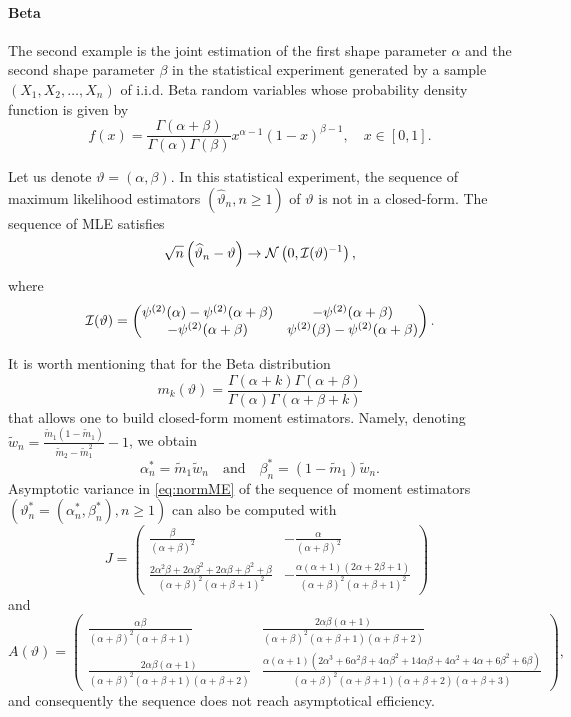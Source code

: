 

\paragraph{Beta}

The second example is the joint estimation of the first shape parameter $\alpha$ and the second shape parameter $\beta$ in the statistical experiment generated by a sample $(X_1,X_2,\ldots,X_n)$ of i.i.d. Beta random variables whose probability density function is given by
$$ f(x)= \frac{\Gamma(\alpha+\beta)}{\Gamma(\alpha)\Gamma(\beta)}x^{\alpha-1} (1-x)^{\beta-1}, \quad x \in [0,1].$$

Let us denote $\vartheta=(\alpha,\beta)$. In this statistical experiment, the sequence of maximum likelihood estimators $(\widehat{\vartheta}_n, n \geq 1)$ of $\vartheta$ is not in a closed-form.  The sequence of MLE satisfies 
$$ \sqrt{n}\left( \widehat{\vartheta}_n-\vartheta \right) \rightarrow {\cal N}\left(0,{\cal I}(\vartheta)^{-1}\right),$$
where 
$$ {\cal I}(\vartheta)=\begin{pmatrix} \psi^{(2)}(\alpha) - \psi^{(2)}(\alpha+\beta)& -\psi^{(2)}(\alpha+\beta) \\ - \psi^{(2)}(\alpha+\beta) &  \psi^{(2)}(\beta) - \psi^{(2)}(\alpha+\beta)\end{pmatrix}.$$

It is worth mentioning that for the Beta distribution 
$$ m_k(\vartheta) = \frac{\Gamma(\alpha+k)\Gamma(\alpha+\beta)}{\Gamma(\alpha)\Gamma(\alpha+\beta+k)}$$
that allows one to build closed-form moment estimators. Namely, denoting
$\tilde{w}_n= \frac{\tilde{m}_1(1-\tilde{m}_1)}{\tilde{m}_2-\tilde{m}_1^2} -1$, we obtain
$$\alpha^*_n= \tilde{m}_1 \tilde{w}_n \quad \mbox{and} \quad \beta^*_n= (1-\tilde{m}_1 )  \tilde{w}_n.$$ 
Asymptotic variance in \eqref{eq:normME} of the sequence of moment estimators $(\vartheta^*_n=(\alpha^*_n,\beta^*_n), n \geq1)$ can also be computed with
$$ \quad J=\begin{pmatrix}  \frac{\beta}{(\alpha+\beta)^2} &   -\frac{\alpha}{(\alpha+\beta)^2}  \\  \frac{2\alpha^2\beta+2\alpha \beta^2 + 2\alpha \beta +\beta^2 +\beta}{(\alpha+\beta)^2(\alpha+\beta+1)^2}  &  - \frac{ \alpha(\alpha +1)(2\alpha+2\beta+1)}{(\alpha+\beta)^2(\alpha+\beta+1)^2}  \end{pmatrix}$$
and
$$ A(\vartheta)=\begin{pmatrix} \frac{\alpha\beta}{(\alpha+\beta)^2(\alpha+\beta+1)} & \frac{2 \alpha \beta(\alpha +1)}{(\alpha+\beta)^2(\alpha+\beta+1)(\alpha+\beta+2)} \\ \frac{2 \alpha \beta(\alpha +1)}{(\alpha+\beta)^2(\alpha+\beta+1)(\alpha+\beta+2)} & \frac{\alpha(\alpha+1)(2\alpha^3+6\alpha^2\beta+4\alpha\beta^2+14\alpha\beta+4 \alpha^2+4\alpha+6\beta^2+6\beta)}{(\alpha+\beta)^2(\alpha+\beta+1)(\alpha+\beta+2)(\alpha+\beta+3)}\end{pmatrix},$$
and consequently the sequence does not reach asymptotical efficiency.

